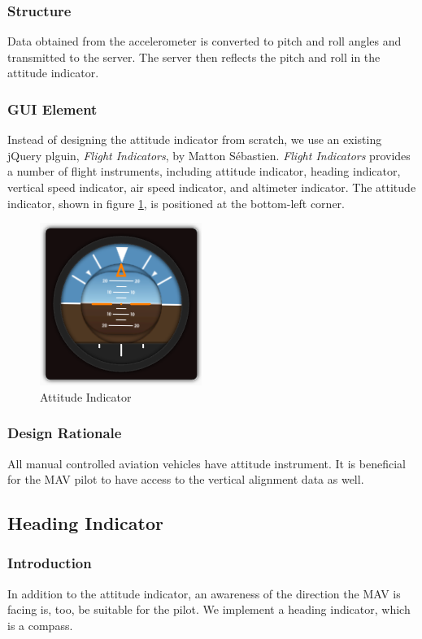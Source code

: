 \documentclass[onecolumn, oneside, letterpaper, draftclsnofoot, 10pt, compsoc]{IEEEtran}
\begin{document}
\subsubsection{Structure}
Data obtained from the accelerometer is converted to pitch and roll angles and transmitted to the server. The server then reflects the pitch and roll in the attitude indicator.

\subsubsection{GUI Element}
Instead of designing the attitude indicator from scratch, we use an existing jQuery plguin, \textit{Flight Indicators}, by Matton Sébastien. \textit{Flight Indicators} provides a number of flight instruments, including attitude indicator, heading indicator, vertical speed indicator, air speed indicator, and altimeter indicator. The attitude indicator, shown in figure \ref{fig:attitude}, is positioned at the bottom-left corner.

\begin{figure}[h]
    \centering
    \includegraphics{graphics/attitude.png}
    \caption{Attitude Indicator}
    \label{fig:attitude}
\end{figure}

\subsubsection{Design Rationale}
All manual controlled aviation vehicles have attitude instrument. It is beneficial for the MAV pilot to have access to the vertical alignment data as well.

\subsection{Heading Indicator}
\subsubsection{Introduction}
In addition to the attitude indicator, an awareness of the direction the MAV is facing is, too, be suitable for the pilot. We implement a heading indicator, which is a compass.
\end{document}
